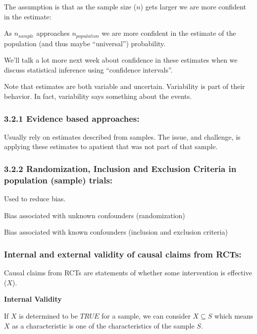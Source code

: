 \documentclass[
]{book}
\begin{document}
The assumption is that as the sample size (\(n\)) gets larger we are more confident in the estimate:

As \(n_{sample}\) approaches \(n_{population}\) we are more confident in the estimate of the population (and thus maybe ``universal'') probability.

We'll talk a lot more next week about confidence in these estimates when we discuss statistical inference using ``confidence intervals''.

Note that estimates are both variable and uncertain. Variability is part of their behavior. In fact, variability says something about the events.

\hypertarget{evidence-based-approaches}{%
\subsubsection{3.2.1 Evidence based approaches:}\label{evidence-based-approaches}}

Usually rely on estimates described from samples. The issue, and challenge, is applying these estimates to apatient that was not part of that sample.

\hypertarget{randomization-inclusion-and-exclusion-criteria-in-population-sample-trials}{%
\subsubsection{3.2.2 Randomization, Inclusion and Exclusion Criteria in population (sample) trials:}\label{randomization-inclusion-and-exclusion-criteria-in-population-sample-trials}}

Used to reduce bias.

Bias associated with unknown confounders (randomization)

Bias associated with known confounders (inclusion and exclusion criteria)

\hypertarget{internal-and-external-validity-of-causal-claims-from-rcts}{%
\subsubsection{Internal and external validity of causal claims from RCTs:}\label{internal-and-external-validity-of-causal-claims-from-rcts}}

Causal claims from RCTs are statements of whether some intervention is effective (\(X\)).

\textbf{Internal Validity}

If \(X\) is determined to be \(TRUE\) for a sample, we can consider \(X \subseteq S\) which means \(X\) as a characteristic is one of the characteristics of the sample \(S\).
\end{document}
